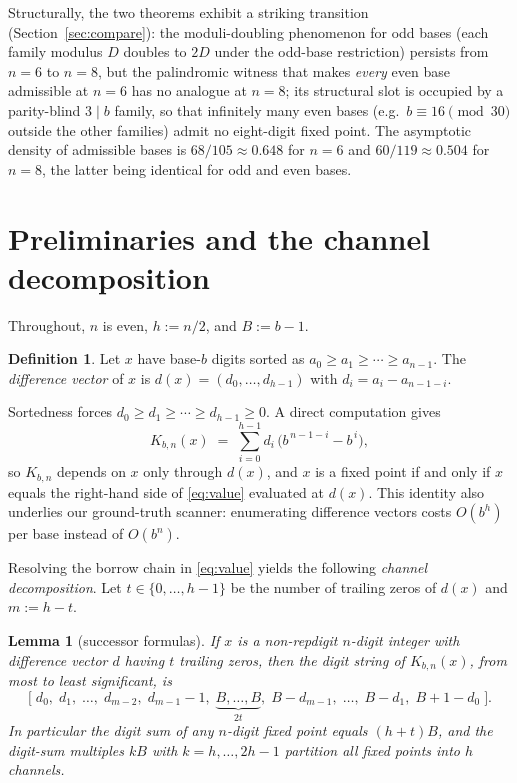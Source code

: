 \documentclass[11pt]{amsart}
\newtheorem{lemma}[theorem]{Lemma}
\theoremstyle{definition}
\newtheorem{definition}[theorem]{Definition}
\begin{document}
Structurally, the two theorems exhibit a striking transition
(Section~\ref{sec:compare}): the moduli-doubling phenomenon for odd
bases (each family modulus $D$ doubles to $2D$ under the odd-base
restriction) persists from $n=6$ to $n=8$, but the palindromic witness
that makes \emph{every} even base admissible at $n=6$ has no analogue at
$n=8$; its structural slot is occupied by a parity-blind $3\mid b$
family, so that infinitely many even bases (e.g.\ $b\equiv 16\pmod{30}$
outside the other families) admit no eight-digit fixed point. The
asymptotic density of admissible bases is $68/105\approx 0.648$ for
$n=6$ and $60/119\approx 0.504$ for $n=8$, the latter being identical
for odd and even bases.

\section{Preliminaries and the channel decomposition}\label{sec:channels}

Throughout, $n$ is even, $h:=n/2$, and $B:=b-1$.

\begin{definition}
Let $x$ have base-$b$ digits sorted as $a_0\ge a_1\ge\cdots\ge a_{n-1}$.
The \emph{difference vector} of $x$ is
$d(x)=(d_0,\dots,d_{h-1})$ with $d_i=a_i-a_{n-1-i}$.
\end{definition}

Sortedness forces $d_0\ge d_1\ge\cdots\ge d_{h-1}\ge 0$. A direct
computation gives
\begin{equation}\label{eq:value}
K_{b,n}(x)\;=\;\sum_{i=0}^{h-1} d_i\,\bigl(b^{\,n-1-i}-b^{\,i}\bigr),
\end{equation}
so $K_{b,n}$ depends on $x$ only through $d(x)$, and $x$ is a fixed
point if and only if $x$ equals the right-hand side of \eqref{eq:value}
evaluated at $d(x)$. This identity also underlies our ground-truth
scanner: enumerating difference vectors costs $O(b^{h})$ per base
instead of $O(b^{n})$.

Resolving the borrow chain in \eqref{eq:value} yields the following
\emph{channel decomposition}. Let $t\in\{0,\dots,h-1\}$ be the number of
trailing zeros of $d(x)$ and $m:=h-t$.

\begin{lemma}[successor formulas]\label{lem:succ}
If $x$ is a non-repdigit $n$-digit integer with difference vector $d$
having $t$ trailing zeros, then the digit string of $K_{b,n}(x)$, from
most to least significant, is
\[
\bigl[\;d_0,\; d_1,\;\dots,\; d_{m-2},\; d_{m-1}-1,\;
\underbrace{B,\dots,B}_{2t},\;
B-d_{m-1},\;\dots,\;B-d_1,\; B+1-d_0\;\bigr].
\]
In particular the digit sum of any $n$-digit fixed point equals
$(h+t)B$, and the digit-sum multiples $kB$ with $k=h,\dots,2h-1$
partition all fixed points into $h$ channels.
\end{lemma}
\end{document}
